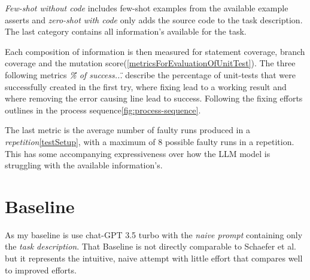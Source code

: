 \documentclass[a4paper,11pt,oneside]{memoir}
\begin{document}
\begin{table}[!ht]
    \centering
    \label{table:exampleTable}
    \caption{Section of data which illustrates the table structure}
\end{table}

\textit{Few-shot without code} includes few-shot examples from the available example asserts and \textit{zero-shot with code} only adds the source code to the task description. The last category contains all information's available for the task.

Each composition of information is then measured for statement coverage, branch coverage and the mutation score(\ref{metricsForEvaluationOfUnitTest}). The three following metrics \textit{\"\% of success...\"} describe the percentage of unit-tests that were successfully created in the first try, where fixing lead to a working result and where removing the error causing line lead to success. Following the fixing efforts outlines in the process sequence\ref{fig:process-sequence}.

The last metric is the average number of faulty runs produced in a \textit{repetition}\ref{testSetup}, with a maximum of 8 possible faulty runs in a repetition. This has some	accompanying expressiveness over how the LLM model is struggling with the available information's. 

\section{Baseline}
As my baseline is use chat-GPT 3.5 turbo with the \textit{naive prompt} containing only the \textit{task description}. That Baseline is not directly comparable to Schaefer et al.\cite{Schaefer_automated_unit_test_generation} but it represents the intuitive, naive attempt with little effort that compares well to improved efforts. 
\end{document}
